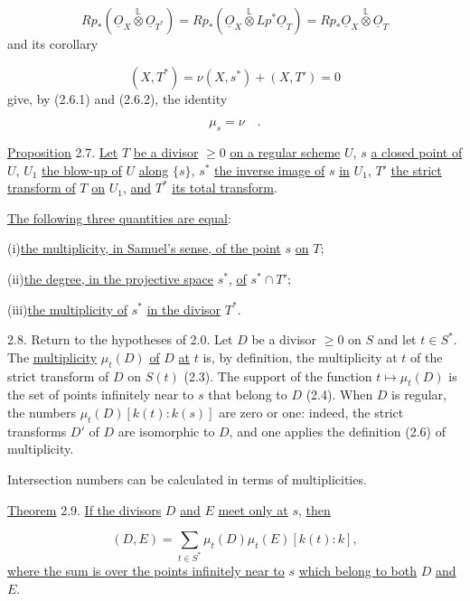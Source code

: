\begin{equation*}
Rp_*(\underline{O}_X\overset{\mathbb L}{\otimes}\underline{O}_{T^*})
=Rp_*(\underline{O}_X\overset{\mathbb L}{\otimes}Lp^*\underline{O}_T)
=Rp_*\underline{O}_X\overset{\mathbb L}{\otimes}\underline{O}_T
\end{equation*}
and its corollary

\begin{equation*}
(X,T^*)=\nu(X,s^*)+(X,T')=0
\end{equation*}
give, by (2.6.1) and (2.6.2), the identity

\begin{equation}\tag{2.6.3}
\mu_s=\nu \quad .
\end{equation}


\underline{Proposition} 2.7. \underline{Let} $T$ \underline{be a divisor}
$\geq0$ \underline{on a regular scheme} $U$, $s$ \underline{a closed point of}
$U$, $U_1$ \underline{the blow-up of} $U$ \underline{along} $\{s\}$, $s^*$
\underline{the inverse image of} $s$ \underline{in} $U_1$, $T'$ \underline{the
strict transform of} $T$ \underline{on} $U_1$, \underline{and} $T^*$
\underline{its total transform}.

\underline{The following three quantities are equal}:

(i)\quad \underline{the multiplicity, in Samuel's sense, of the point} $s$
\underline{on} $T$;

(ii)\quad \underline{the degree, in the projective space} $s^*$,
\underline{of} $s^*\cap T'$;

(iii)\quad \underline{the multiplicity of} $s^*$ \underline{in the divisor}
$T^*$.

2.8. Return to the hypotheses of 2.0.  Let $D$ be a divisor $\geq0$ on $S$ and
let $t\in S^*$.  The \underline{multiplicity} $\mu_t(D)$ \underline{of} $D$
\underline{at} $t$ is, by definition, the multiplicity at $t$ of the strict
transform of $D$ on $S(t)$ (2.3).  The support of the function
$t\mapsto\mu_t(D)$ is the set of points infinitely near to $s$ that belong to
$D$ (2.4).  When $D$ is regular, the numbers
$\mu_t(D)[k(t):k(s)]$ are zero or one: indeed, the strict transforms $D'$ of $D$
are isomorphic to $D$, and one applies the definition (2.6) of multiplicity.

Intersection numbers can be calculated in terms of multiplicities.

\underline{Theorem} 2.9. \underline{If the divisors} $D$ \underline{and} $E$
\underline{meet only at} $s$, \underline{then}

\begin{equation*}
(D,E)=\sum_{t\in S^*}\mu_t(D)\mu_t(E)[k(t):k],
\end{equation*}
\underline{where the sum is over the points infinitely near to} $s$
\underline{which belong to both} $D$ \underline{and} $E$.

